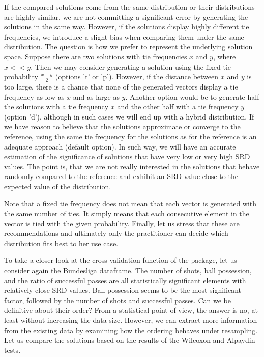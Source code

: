 If the compared solutions come from the same distribution or their distributions are highly similar, we are not committing a significant error by generating the solutions in the same way. However, if the solutions display highly different tie frequencies, we introduce a slight bias when comparing them under the same distribution. The question is how we prefer to represent the underlying solution space. Suppose there are two solutions with tie frequencies $x$ and $y$, where $x<<y$. Then we may consider generating a solution using the fixed tie probability $\frac{x+y}{2}$ (options 't' or 'p'). However, if the distance between $x$ and $y$ is too large, there is a chance that none of the generated vectors display a tie frequency as low as $x$ and as large as $y$. Another option would be to generate half the solutions with a tie frequency $x$ and the other half with a tie frequency $y$ (option 'd'), although in such cases we will end up with a hybrid distribution. If we have reason to believe that the solutions approximate or converge to the reference, using the same tie frequency for the solutions as for the reference is an adequate approach (default option). In such way, we will have an accurate estimation of the significance of solutions that have very low or very high SRD values. The point is, that we are not really interested in the solutions that behave randomly compared to the reference and exhibit an SRD value close to the expected value of the distribution.

Note that a fixed tie frequency does not mean that each vector is generated with the same number of ties. It simply means that each consecutive element in the vector is tied with the given probability.
Finally, let us stress that these are recommendations and ultimately only the practitioner can decide which distribution fits best to her use case.

To take a closer look at the cross-validation function of the package, let us consider again the Bundesliga dataframe. The number of shots, ball possession, and the ratio of successful passes are all statistically significant elements with relatively close SRD values. Ball possession seems to be the most significant factor, followed by the number of shots and successful passes. Can we be definitive about their order? From a statistical point of view, the answer is no, at least without increasing the data size. However, we can extract more information from the existing data by examining how the ordering behaves under resampling.  Let us compare the solutions based on the results of the Wilcoxon and Alpaydin tests.

